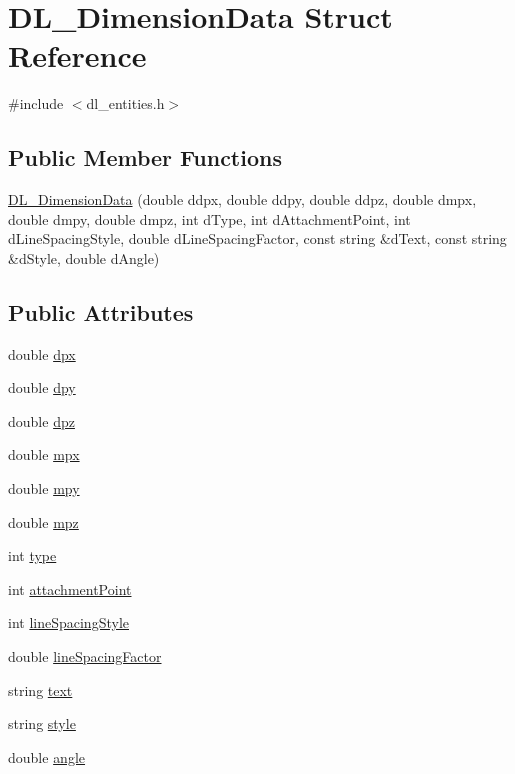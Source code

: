 \hypertarget{structDL__DimensionData}{\section{D\-L\-\_\-\-Dimension\-Data Struct Reference}
\label{structDL__DimensionData}
}


{\ttfamily \#include $<$dl\-\_\-entities.\-h$>$}

\subsection*{Public Member Functions}
\begin{DoxyCompactItemize}
\item 
\hyperlink{structDL__DimensionData_a88bde3e9b8fb67d9cc06ba89bdd37ec7}{D\-L\-\_\-\-Dimension\-Data} (double ddpx, double ddpy, double ddpz, double dmpx, double dmpy, double dmpz, int d\-Type, int d\-Attachment\-Point, int d\-Line\-Spacing\-Style, double d\-Line\-Spacing\-Factor, const string \&d\-Text, const string \&d\-Style, double d\-Angle)
\end{DoxyCompactItemize}
\subsection*{Public Attributes}
\begin{DoxyCompactItemize}
\item 
double \hyperlink{structDL__DimensionData_a08b464fb7d6d2cf3aeeb9784aeba43a5}{dpx}
\item 
double \hyperlink{structDL__DimensionData_a393e68ec30ec8f2ac112cb31e6a26fd7}{dpy}
\item 
double \hyperlink{structDL__DimensionData_a3e43631783886cdda86b70738c6bc9a2}{dpz}
\item 
double \hyperlink{structDL__DimensionData_aa6719793c1cd7941fab5b1017548c15a}{mpx}
\item 
double \hyperlink{structDL__DimensionData_a3c1d57ae67f639a462008fbf001c5ba2}{mpy}
\item 
double \hyperlink{structDL__DimensionData_a61eafd0c3dff5f902559f6b112647198}{mpz}
\item 
int \hyperlink{structDL__DimensionData_afd0fc072454a42bb06922cf96db6512b}{type}
\item 
int \hyperlink{structDL__DimensionData_a0dab1cab77a156a4eb52327012ea1239}{attachment\-Point}
\item 
int \hyperlink{structDL__DimensionData_aff9d21fe4772c475795b3c4bde00b711}{line\-Spacing\-Style}
\item 
double \hyperlink{structDL__DimensionData_a9f7b4efea9265483956b6e647a738d5d}{line\-Spacing\-Factor}
\item 
string \hyperlink{structDL__DimensionData_a2113da4c64efdfa87d05d4a8cab1e13e}{text}
\item 
string \hyperlink{structDL__DimensionData_a436c9dc68556241935bf69229b400b38}{style}
\item 
double \hyperlink{structDL__DimensionData_afd8dffdf019754353a13ca80bf77efb9}{angle}
\end{DoxyCompactItemize}


